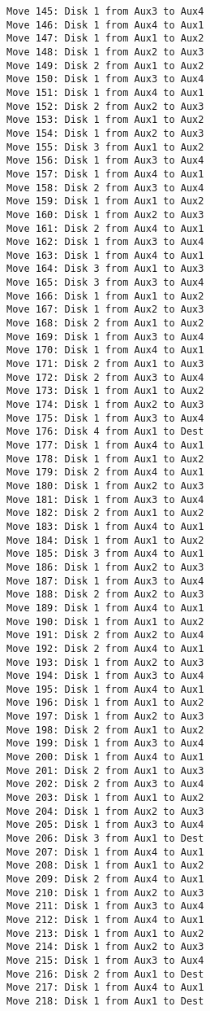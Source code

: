 \documentclass[11pt]{article}
\begin{document}
\begin{multicols}{2}
\begin{Verbatim}[fontsize=\small]
Move 145: Disk 1 from Aux3 to Aux4
Move 146: Disk 1 from Aux4 to Aux1
Move 147: Disk 1 from Aux1 to Aux2
Move 148: Disk 1 from Aux2 to Aux3
Move 149: Disk 2 from Aux1 to Aux2
Move 150: Disk 1 from Aux3 to Aux4
Move 151: Disk 1 from Aux4 to Aux1
Move 152: Disk 2 from Aux2 to Aux3
Move 153: Disk 1 from Aux1 to Aux2
Move 154: Disk 1 from Aux2 to Aux3
Move 155: Disk 3 from Aux1 to Aux2
Move 156: Disk 1 from Aux3 to Aux4
Move 157: Disk 1 from Aux4 to Aux1
Move 158: Disk 2 from Aux3 to Aux4
Move 159: Disk 1 from Aux1 to Aux2
Move 160: Disk 1 from Aux2 to Aux3
Move 161: Disk 2 from Aux4 to Aux1
Move 162: Disk 1 from Aux3 to Aux4
Move 163: Disk 1 from Aux4 to Aux1
Move 164: Disk 3 from Aux1 to Aux3
Move 165: Disk 3 from Aux3 to Aux4
Move 166: Disk 1 from Aux1 to Aux2
Move 167: Disk 1 from Aux2 to Aux3
Move 168: Disk 2 from Aux1 to Aux2
Move 169: Disk 1 from Aux3 to Aux4
Move 170: Disk 1 from Aux4 to Aux1
Move 171: Disk 2 from Aux1 to Aux3
Move 172: Disk 2 from Aux3 to Aux4
Move 173: Disk 1 from Aux1 to Aux2
Move 174: Disk 1 from Aux2 to Aux3
Move 175: Disk 1 from Aux3 to Aux4
Move 176: Disk 4 from Aux1 to Dest
Move 177: Disk 1 from Aux4 to Aux1
Move 178: Disk 1 from Aux1 to Aux2
Move 179: Disk 2 from Aux4 to Aux1
Move 180: Disk 1 from Aux2 to Aux3
Move 181: Disk 1 from Aux3 to Aux4
Move 182: Disk 2 from Aux1 to Aux2
Move 183: Disk 1 from Aux4 to Aux1
Move 184: Disk 1 from Aux1 to Aux2
Move 185: Disk 3 from Aux4 to Aux1
Move 186: Disk 1 from Aux2 to Aux3
Move 187: Disk 1 from Aux3 to Aux4
Move 188: Disk 2 from Aux2 to Aux3
Move 189: Disk 1 from Aux4 to Aux1
Move 190: Disk 1 from Aux1 to Aux2
Move 191: Disk 2 from Aux2 to Aux4
Move 192: Disk 2 from Aux4 to Aux1
Move 193: Disk 1 from Aux2 to Aux3
Move 194: Disk 1 from Aux3 to Aux4
Move 195: Disk 1 from Aux4 to Aux1
Move 196: Disk 1 from Aux1 to Aux2
Move 197: Disk 1 from Aux2 to Aux3
Move 198: Disk 2 from Aux1 to Aux2
Move 199: Disk 1 from Aux3 to Aux4
Move 200: Disk 1 from Aux4 to Aux1
Move 201: Disk 2 from Aux1 to Aux3
Move 202: Disk 2 from Aux3 to Aux4
Move 203: Disk 1 from Aux1 to Aux2
Move 204: Disk 1 from Aux2 to Aux3
Move 205: Disk 1 from Aux3 to Aux4
Move 206: Disk 3 from Aux1 to Dest
Move 207: Disk 1 from Aux4 to Aux1
Move 208: Disk 1 from Aux1 to Aux2
Move 209: Disk 2 from Aux4 to Aux1
Move 210: Disk 1 from Aux2 to Aux3
Move 211: Disk 1 from Aux3 to Aux4
Move 212: Disk 1 from Aux4 to Aux1
Move 213: Disk 1 from Aux1 to Aux2
Move 214: Disk 1 from Aux2 to Aux3
Move 215: Disk 1 from Aux3 to Aux4
Move 216: Disk 2 from Aux1 to Dest
Move 217: Disk 1 from Aux4 to Aux1
Move 218: Disk 1 from Aux1 to Dest
\end{Verbatim}


\end{multicols}
\end{document}
